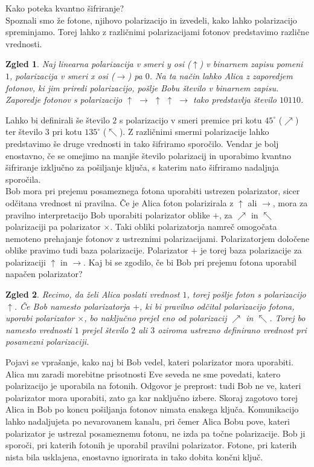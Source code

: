 \documentclass[A4paper, 11pt]{article}
\newtheorem{zgled}{Zgled}
\begin{document}
Kako poteka kvantno šifriranje?\\
Spoznali smo že fotone, njihovo polarizacijo in izvedeli, kako lahko polarizacijo spreminjamo. Torej lahko z različnimi polarizacijami fotonov predstavimo različne vrednosti.

\begin{zgled}
Naj linearna polarizacija v smeri y osi ($\uparrow$) v binarnem zapisu pomeni $1$, polarizacija v smeri x osi ($\rightarrow$) pa $0$. Na ta način lahko Alica z zaporedjem fotonov, ki jim priredi polarizacijo, pošlje Bobu število v binarnem zapisu. Zaporedje fotonov s polarizacijo $\uparrow$ $\rightarrow$ $\uparrow$ $\uparrow$ $\rightarrow$ tako predstavlja število $10110$.
\end{zgled}

Lahko bi definirali še število $2$ s polarizacijo v smeri premice pri kotu $45^{\circ}$ ($\nearrow$) ter število $3$ pri kotu $135^{\circ}$ ($\nwarrow$). Z različnimi smermi polarizacije lahko predstavimo še druge vrednosti in tako šifriramo sporočilo. Vendar je bolj enostavno, če se omejimo na manjše število polarizacij in uporabimo kvantno šifriranje izključno za pošiljanje ključa, s katerim nato šifriramo nadaljnja sporočila. \\

Bob mora pri prejemu posameznega fotona uporabiti ustrezen polarizator, sicer odčitana vrednost ni pravilna. Če je Alica foton polarizirala z $\uparrow$ ali $\rightarrow$, mora za pravilno interpretacijo Bob uporabiti polarizator oblike $+$, za $\nearrow$ in $\nwarrow$ polarizaciji pa polarizator $\times$. Taki obliki polarizatorja namreč omogočata nemoteno prehajanje fotonov z ustreznimi polarizacijami. Polarizatorjem določene oblike pravimo tudi baza polarizacije. Polarizator $+$ je torej baza polarizacije za polarizaciji $\uparrow$ in $\rightarrow$. Kaj bi se zgodilo, če bi Bob pri prejemu fotona uporabil napačen polarizator?

\begin{zgled}
Recimo, da želi Alica poslati vrednost $1$, torej pošlje foton s polarizacijo $\uparrow$. Če Bob namesto polarizatorja $+$, ki bi pravilno odčital polarizacijo fotona, uporabi polarizator $\times$, bo naključno prejel eno od polarizacij $\nearrow$ in $\nwarrow$. Torej bo namesto vrednosti $1$ prejel število $2$ ali $3$ oziroma ustrezno definirano vrednost pri posamezni polarizaciji.
\end{zgled}

Pojavi se vprašanje, kako naj bi Bob vedel, kateri polarizator mora uporabiti. Alica mu zaradi morebitne prisotnosti Eve seveda ne sme povedati, katero polarizacijo je uporabila na fotonih. Odgovor je preprost: tudi Bob ne ve, kateri polarizator mora uporabiti, zato ga kar naključno izbere. Skoraj zagotovo torej Alica in Bob po koncu pošiljanja fotonov nimata enakega ključa. Komunikacijo lahko nadaljujeta po nevarovanem kanalu, pri čemer Alica Bobu pove, kateri polarizator je ustrezal posameznemu fotonu, ne izda pa točne polarizacije. Bob ji sporoči, pri katerih fotonih je uporabil pravilni polarizator. Fotone, pri katerih nista bila usklajena, enostavno ignorirata in tako dobita končni ključ. \\
\end{document}

